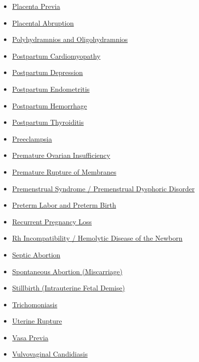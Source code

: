 \begin{itemize}[noitemsep]
  \item \hyperlink{sec:Placenta Previa}{Placenta Previa}
  \item \hyperlink{sec:Placental Abruption}{Placental Abruption}
  \item \hyperlink{sec:Polyhydramnios and Oligohydramnios}{Polyhydramnios and Oligohydramnios}
  \item \hyperlink{sec:Postpartum Cardiomyopathy}{Postpartum Cardiomyopathy}
  \item \hyperlink{sec:Postpartum Depression}{Postpartum Depression}
  \item \hyperlink{sec:Postpartum Endometritis}{Postpartum Endometritis}
  \item \hyperlink{sec:Postpartum Hemorrhage}{Postpartum Hemorrhage}
  \item \hyperlink{sec:Postpartum Thyroiditis}{Postpartum Thyroiditis}
  \item \hyperlink{sec:Preeclampsia}{Preeclampsia}
  \item \hyperlink{sec:Premature Ovarian Insufficiency}{Premature Ovarian Insufficiency}
  \item \hyperlink{sec:Premature Rupture of Membranes}{Premature Rupture of Membranes}
  \item \hyperlink{sec:PMS PMDD}{Premenstrual Syndrome / Premenstrual Dysphoric Disorder}
  \item \hyperlink{sec:Preterm Labor and Preterm Birth}{Preterm Labor and Preterm Birth}
  \item \hyperlink{sec:Recurrent Pregnancy Loss}{Recurrent Pregnancy Loss}
  \item \hyperlink{sec:Rh Incompatibility}{Rh Incompatibility / Hemolytic Disease of the Newborn}
  \item \hyperlink{sec:Septic Abortion}{Septic Abortion}
  \item \hyperlink{sec:Spontaneous Abortion}{Spontaneous Abortion (Miscarriage)}
  \item \hyperlink{sec:Stillbirth}{Stillbirth (Intrauterine Fetal Demise)}
  \item \hyperlink{sec:Trichomoniasis}{Trichomoniasis}
  \item \hyperlink{sec:Uterine Rupture}{Uterine Rupture}
  \item \hyperlink{sec:Vasa Previa}{Vasa Previa}
  \item \hyperlink{sec:Vulvovaginal Candidiasis}{Vulvovaginal Candidiasis}
\end{itemize}

